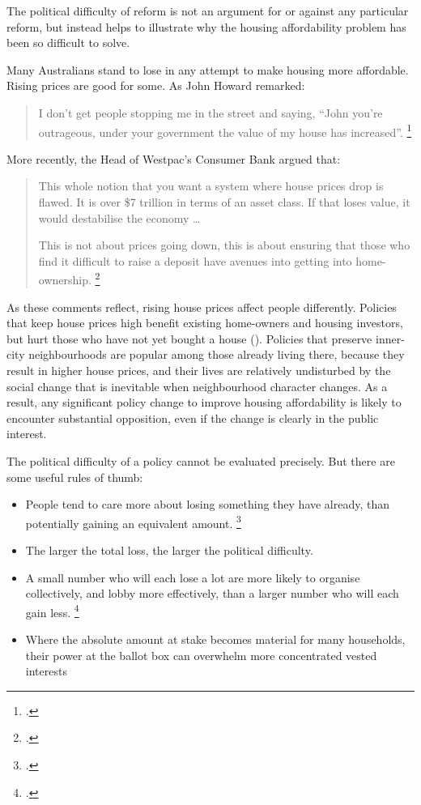 The political difficulty of reform is not an argument for or against any particular reform, but instead helps to illustrate why the housing affordability problem has been so difficult to solve.

Many Australians stand to lose in any attempt to make housing more affordable.
Rising prices are good for some.
As John Howard remarked:

\begin{quote}
I don't get people stopping me in the street and saying, ``John you're outrageous, under your government the value of my house has increased''.%
	\footcite{age-2003-house-prices}
\end{quote}

More recently, the Head of Westpac's Consumer Bank argued that:

\begin{quote}
This whole notion that you want a system where house prices drop is flawed.
It is over \$7 trillion in terms of an asset class.
If that loses value, it would destabilise the economy \ldots{}

This is not about prices going down, this is about ensuring that those who find it difficult to raise a deposit have avenues into getting into home-ownership.%
	\footcite{Smith2017Westpac}
\end{quote}

As these comments reflect, rising house prices affect people differently.
Policies that keep house prices high benefit existing home-owners and housing investors, but hurt those who have not yet bought a house ().
Policies that preserve inner-city neighbourhoods are popular among those already living there, because they result in higher house prices, and their lives are relatively undisturbed by the social change that is inevitable when neighbourhood character changes.
As a result, any significant policy change to improve housing affordability is likely to encounter substantial opposition, even if the change is clearly in the public interest.

The political difficulty of a policy cannot be evaluated precisely.
But there are some useful rules of thumb:

\begin{itemize}
    \item People tend to care more about losing something they have already, than potentially gaining an equivalent amount.%
	\footcite{Kahneman2012}
    \item The larger the total loss, the larger the political difficulty.
    \item A small number who will each lose a lot are more likely to organise collectively, and lobby more effectively, than a larger number who will each gain less.%
	\footcite{Olson2009logiccollectiveaction}
    \item Where the absolute amount at stake becomes material for many households, their power at the ballot box can overwhelm more concentrated vested interests
\end{itemize}

